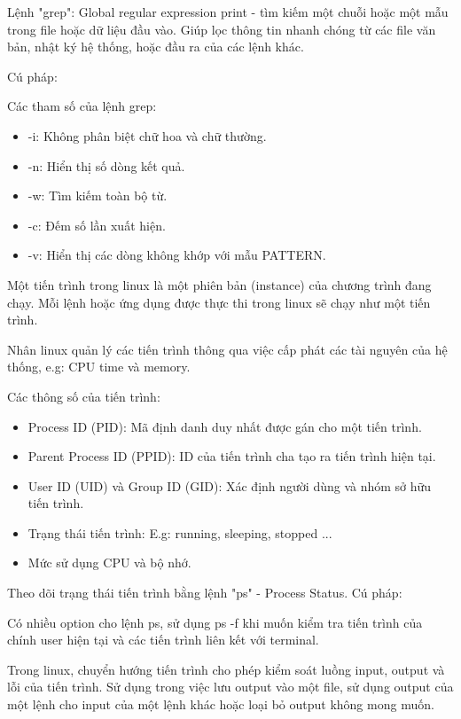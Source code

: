 \documentclass[12pt,a4paper]{article}
\begin{document}
	\par Lệnh "grep": Global regular expression print - tìm kiếm một chuỗi hoặc một mẫu trong file hoặc dữ liệu đầu vào. Giúp lọc thông tin nhanh chóng từ các file văn bản, nhật ký hệ thống, hoặc đầu ra của các lệnh khác.
	\par Cú pháp:
	\begin{center}
	\end{center}
	\par Các tham số của lệnh grep:
	\begin{itemize}
		\item -i: Không phân biệt chữ hoa và chữ thường.
		\item -n: Hiển thị số dòng kết quả.
		\item -w: Tìm kiếm toàn bộ từ.
		\item -c: Đếm số lần xuất hiện.
		\item -v: Hiển thị các dòng không khớp với mẫu PATTERN.
	\end{itemize}
	\par Một tiến trình trong linux là một phiên bản (instance) của chương trình đang chạy. Mỗi lệnh hoặc ứng dụng được thực thi trong linux sẽ chạy như một tiến trình.
	\par Nhân linux quản lý các tiến trình thông qua việc cấp phát các tài nguyên của hệ thống, e.g: CPU time và memory.
	\par Các thông số của tiến trình: 
	\begin{itemize}
		\item Process ID (PID): Mã định danh duy nhất được gán cho một tiến trình.
		\item Parent Process ID (PPID): ID của tiến trình cha tạo ra tiến trình hiện tại.
		\item User ID (UID) và Group ID (GID): Xác định người dùng và nhóm sở hữu tiến trình.
		\item Trạng thái tiến trình: E.g: running, sleeping, stopped ...
		\item Mức sử dụng CPU và bộ nhớ.
	\end{itemize}
	\par Theo dõi trạng thái tiến trình bằng lệnh "ps" - Process Status. Cú pháp:
	\begin{center}
	\end{center}
	Có nhiều option cho lệnh ps, sử dụng ps -f khi muốn kiểm tra tiến trình của chính user hiện tại và các tiến trình liên kết với terminal.
	\par Trong linux, chuyển hướng tiến trình cho phép kiểm soát luồng input, output và lỗi của tiến trình. Sử dụng trong việc lưu output vào một file, sử dụng output của một lệnh cho input của một lệnh khác hoặc loại bỏ output không mong muốn.
\end{document}
